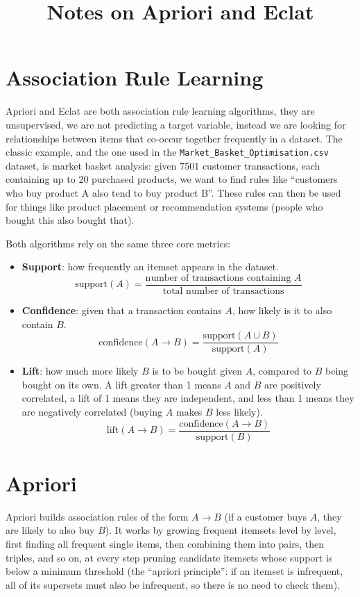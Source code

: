 \documentclass[conference]{IEEEtran}
\title{Notes on Apriori and Eclat}
\author{
\IEEEauthorblockN{Luis Mendez}
}
\begin{document}
\maketitle

\section*{Association Rule Learning}
Apriori and Eclat are both association rule learning algorithms, they are unsupervised, we are not predicting a target variable, instead we are looking for relationships between items that co-occur together frequently in a dataset. The classic example, and the one used in the \texttt{Market\_Basket\_Optimisation.csv} dataset, is market basket analysis: given $7501$ customer transactions, each containing up to $20$ purchased products, we want to find rules like ``customers who buy product A also tend to buy product B''. These rules can then be used for things like product placement or recommendation systems (people who bought this also bought that).

Both algorithms rely on the same three core metrics:
\begin{itemize}
    \item \textbf{Support}: how frequently an itemset appears in the dataset.
    \[
        \text{support}(A) = \frac{\text{number of transactions containing } A}{\text{total number of transactions}}
    \]
    \item \textbf{Confidence}: given that a transaction contains $A$, how likely is it to also contain $B$.
    \[
        \text{confidence}(A \rightarrow B) = \frac{\text{support}(A \cup B)}{\text{support}(A)}
    \]
    \item \textbf{Lift}: how much more likely $B$ is to be bought given $A$, compared to $B$ being bought on its own. A lift greater than 1 means $A$ and $B$ are positively correlated, a lift of 1 means they are independent, and less than 1 means they are negatively correlated (buying $A$ makes $B$ less likely).
    \[
        \text{lift}(A \rightarrow B) = \frac{\text{confidence}(A \rightarrow B)}{\text{support}(B)}
    \]
\end{itemize}

\section*{Apriori}
Apriori builds association rules of the form $A \rightarrow B$ (if a customer buys $A$, they are likely to also buy $B$). It works by growing frequent itemsets level by level, first finding all frequent single items, then combining them into pairs, then triples, and so on, at every step pruning candidate itemsets whose support is below a minimum threshold (the ``apriori principle'': if an itemset is infrequent, all of its supersets must also be infrequent, so there is no need to check them).
\end{document}
